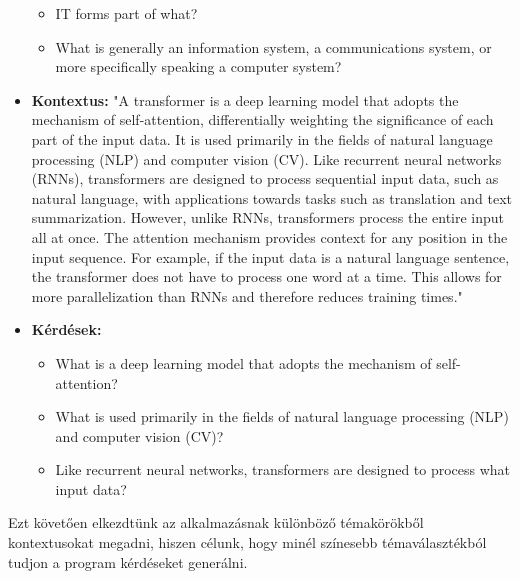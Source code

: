 \begin{itemize}
\begin{itemize}
		\item IT forms part of what?
		\item What is generally an information system, a communications system, or more specifically speaking a computer system?
	\end{itemize}
	\item \textbf{Kontextus:} "A transformer is a deep learning model that adopts the mechanism of self-attention, differentially weighting the significance of each part of the input data. It is used primarily in the fields of natural language processing (NLP) and computer vision (CV).
Like recurrent neural networks (RNNs), transformers are designed to process sequential input data, such as natural language, with applications towards tasks such as translation and text summarization. However, unlike RNNs, transformers process the entire input all at once. The attention mechanism provides context for any position in the input sequence. For example, if the input data is a natural language sentence, the transformer does not have to process one word at a time. This allows for more parallelization than RNNs and therefore reduces training times."
\item \textbf{Kérdések:}
	\begin{itemize}
		\item What is a deep learning model that adopts the mechanism of self-attention?
		\item What is used primarily in the fields of natural language processing (NLP) and computer vision (CV)?
		\item Like recurrent neural networks, transformers are designed to process what input data?
	\end{itemize}
\end{itemize}

Ezt követően elkezdtünk az alkalmazásnak különböző témakörökből kontextusokat megadni, hiszen célunk, hogy minél színesebb témaválasztékból tudjon a program kérdéseket generálni.

